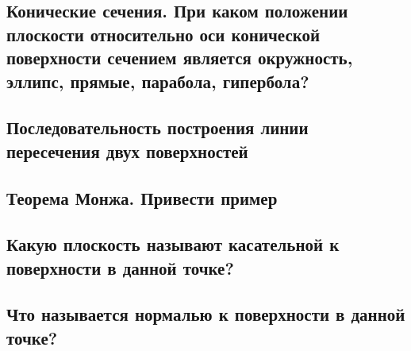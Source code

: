 \subsection{Конические сечения. При каком положении плоскости относительно оси конической поверхности сечением является окружность, эллипс, прямые, парабола, гипербола?}
\subsection{Последовательность построения линии пересечения двух поверхностей}
\subsection{Теорема Монжа. Привести пример}
\subsection{Какую плоскость называют касательной к поверхности в данной точке?}
\subsection{Что называется нормалью к поверхности в данной точке?}

